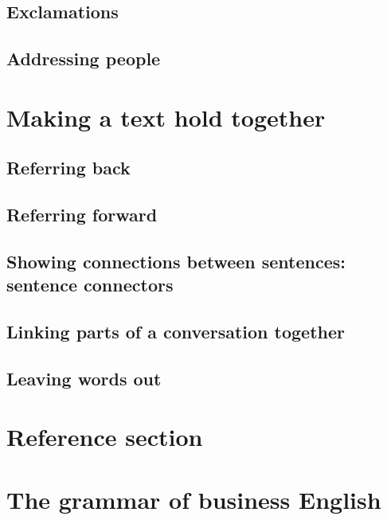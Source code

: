 \documentclass[oneside]{book}
\numberwithin{equation}{section}
\begin{document}
\section{Exclamations}

\section{Addressing people}


\chapter{Making a text hold together}

\section{Referring back}

\section{Referring forward}

\section{Showing connections between sentences: sentence connectors}

\section{Linking parts of a conversation together}

\section{Leaving words out}


\chapter{Reference section}


\chapter{The grammar of business English}
\end{document}
